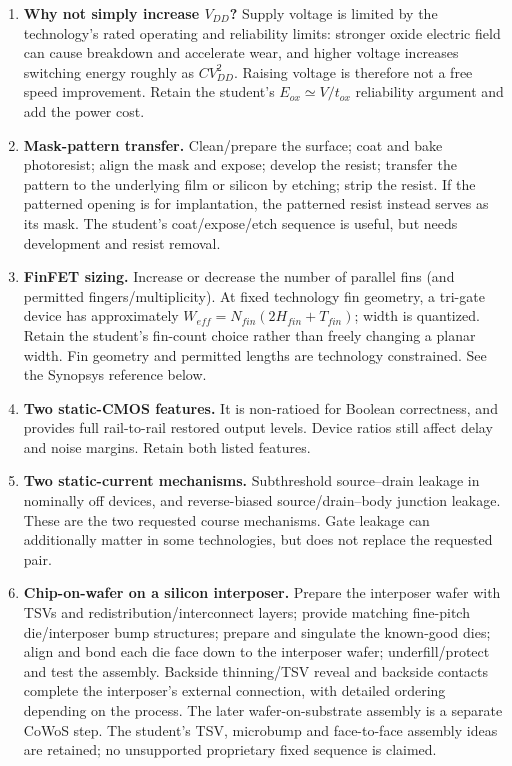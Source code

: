 \documentclass[10pt]{article}
\begin{document}
\begin{enumerate}[label=(\alph*),leftmargin=7mm,itemsep=6pt]
\item \textbf{Why not simply increase $V_{DD}$?} Supply voltage is limited by the technology's rated operating and reliability limits: stronger oxide electric field can cause breakdown and accelerate wear, and higher voltage increases switching energy roughly as $C V_{DD}^2$. Raising voltage is therefore not a free speed improvement. Retain the student's $E_{ox}\simeq V/t_{ox}$ reliability argument and add the power cost.
\item \textbf{Mask-pattern transfer.} Clean/prepare the surface; coat and bake photoresist; align the mask and expose; develop the resist; transfer the pattern to the underlying film or silicon by etching; strip the resist. If the patterned opening is for implantation, the patterned resist instead serves as its mask. The student's coat/expose/etch sequence is useful, but needs development and resist removal.
\item \textbf{FinFET sizing.} Increase or decrease the number of parallel fins (and permitted fingers/multiplicity). At fixed technology fin geometry, a tri-gate device has approximately $W_{eff}=N_{fin}(2H_{fin}+T_{fin})$; width is quantized. Retain the student's fin-count choice rather than freely changing a planar width. Fin geometry and permitted lengths are technology constrained. See the Synopsys reference below.
\item \textbf{Two static-CMOS features.} It is non-ratioed for Boolean correctness, and provides full rail-to-rail restored output levels. Device ratios still affect delay and noise margins. Retain both listed features.
\item \textbf{Two static-current mechanisms.} Subthreshold source--drain leakage in nominally off devices, and reverse-biased source/drain--body junction leakage. These are the two requested course mechanisms. Gate leakage can additionally matter in some technologies, but does not replace the requested pair.
\item \textbf{Chip-on-wafer on a silicon interposer.} Prepare the interposer wafer with TSVs and redistribution/interconnect layers; provide matching fine-pitch die/interposer bump structures; prepare and singulate the known-good dies; align and bond each die face down to the interposer wafer; underfill/protect and test the assembly. Backside thinning/TSV reveal and backside contacts complete the interposer's external connection, with detailed ordering depending on the process. The later wafer-on-substrate assembly is a separate CoWoS step. The student's TSV, microbump and face-to-face assembly ideas are retained; no unsupported proprietary fixed sequence is claimed.

\end{enumerate}
\end{document}
